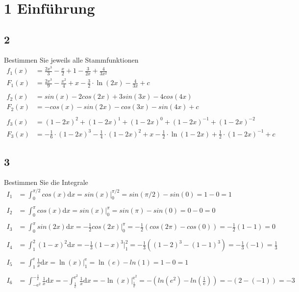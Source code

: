 \documentclass[18pt, 4paper]{article}
\begin{document}
\section*{1 Einführung}
\subsection*{2}
Bestimmen Sie jeweils alle Stammfunktionen
\begin{align*}
f_1(x) &=\frac{2x^3}{3} - \frac{x}{2} + 1 - \frac{3}{2x} + \frac{4}{3x^2}\\
F_1(x) &= \frac{2x^3}{9} - \frac{x^2}{4} + x - \frac{3}{2}\cdot\ln(2x) - \frac{4}{3x}+c\\
\\
f_2(x) &= sin(x) - 2cos(2x) + 3sin(3x) - 4cos(4x)\\
F_2(x) &=  -cos(x) -sin(2x) - cos(3x) - sin(4x) +c\\
\\
f_3(x) &= (1 - 2x)^2 + (1 - 2x)^1 + (1 - 2x)^0 + (1 - 2x)^{-1} + (1 - 2x)^{-2}\\
F_3(x) &=  -\frac{1}{6}\cdot(1-2x)^3 - \frac{1}{4}\cdot(1-2x)^2 + x - \frac{1}{2}\cdot \ln(1-2x) + \frac{1}{2} \cdot (1-2x)^{-1} +c
\end{align*}
\subsection*{3}
Bestimmen Sie die Integrale
\begin{align*}
I_1 &= 
\int_{0}^{\pi/2}cos(x) \mathrm{d}x = 
sin(x)\bigg\vert_{0}^{\pi/2} 
= sin(\pi/2) -sin(0) 
= 1 - 0 
= 1
\\
\\
I_2 &= 
\int_{0}^{\pi}cos(x) \mathrm{d}x = 
sin(x)\bigg\vert_{0}^{\pi} = 
sin(\pi) -sin(0) = 
0 - 0 = 
0
\\
\\
I_3 &= 
\int_{0}^{\pi}sin(2x) \mathrm{d}x = 
-\frac{1}{2}cos(2x)\bigg\vert_{0}^{\pi} = 
-\frac{1}{2}\left(cos(2\pi) - cos(0)\right) = 
-\frac{1}{2}\left(1-1\right)=
0
\\
\\
I_4 &= 
\int_{1}^{2}(1-x)^2 \mathrm{d}x = 
-\frac{1}{3}(1-x)^3\bigg\vert_{1}^{2} = 
-\frac{1}{3}\left((1-2)^3 -(1-1)^3\right) = 
-\frac{1}{3}\left(-1\right)=
\frac{1}{3}
\\
\\
I_5 &=
\int_{1}^{\mathrm{e}}\frac{1}{x} \mathrm{d}x = 
\ln(x)\bigg\vert_{1}^{\mathrm{e}} = 
\ln(e)-ln(1) = 
1-0 = 
1
\\
\\
I_6 &= 
\int_{-\mathrm{e}^2}^{-\frac{1}{\mathrm{e}}}\frac{1}{x} \mathrm{d}x = 
-\int_{\frac{1}{\mathrm{e}}}^{\mathrm{e}^2}\frac{1}{x} \mathrm{d}x =
-\ln(x)\bigg\vert_{\frac{1}{\mathrm{e}}}^{\mathrm{e}^2} = 
-\left(ln(e^2)-ln(\frac{1}{\mathrm{e}})\right) = 
-(2-(-1)) = 
-3
\end{align*}
\end{document}
